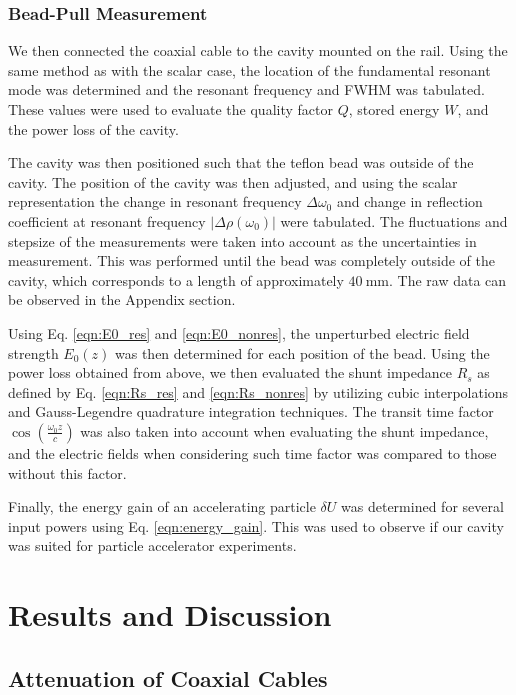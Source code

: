 \documentclass[a4paper]{report}
\numberwithin{equation}{section}
\begin{document}
\subsection{Bead-Pull Measurement}
 

We then connected the coaxial cable to the cavity mounted on the rail. Using the
same method as with the scalar case, the location of the fundamental resonant
mode was determined and the resonant frequency and FWHM was tabulated. These
values were used to evaluate the quality factor $Q$, stored energy $W$, and the
power loss of the cavity. \par 

The cavity was then positioned such that the teflon bead was outside of the
cavity. The position of the cavity was then adjusted, and using the scalar
representation the change in resonant frequency $\Delta\omega_0$ and change in
reflection coefficient at resonant frequency $|\Delta\rho(\omega_0)|$ were
tabulated. The fluctuations and stepsize of the measurements were taken into
account as the uncertainties in measurement. This was performed until the bead
was completely outside of the cavity, which corresponds to a length of
approximately $\SI{40}{\milli\metre}$. The raw data can be observed in the
Appendix section. \par 

Using Eq. \ref{eqn:E0_res} and \ref{eqn:E0_nonres}, the unperturbed electric
field strength $E_0(z)$ was then determined for each position of the bead. Using
the power loss obtained from above, we then evaluated the shunt impedance $R_s$
as defined by Eq. \ref{eqn:Rs_res} and \ref{eqn:Rs_nonres} by
utilizing cubic interpolations and Gauss-Legendre quadrature integration
techniques. The transit time factor $\cos(\frac{\omega_0 z}	{c})$ was also taken
into account when evaluating the shunt impedance, and the electric fields when
considering such time factor was compared to those without this factor. \par 

Finally, the energy gain of an accelerating particle $\delta U$ was determined for several
input powers using Eq. \ref{eqn:energy_gain}. This was used to observe if our cavity was suited for particle
accelerator experiments.

\chapter{Results and Discussion}

\section{Attenuation of Coaxial Cables}
\end{document}
